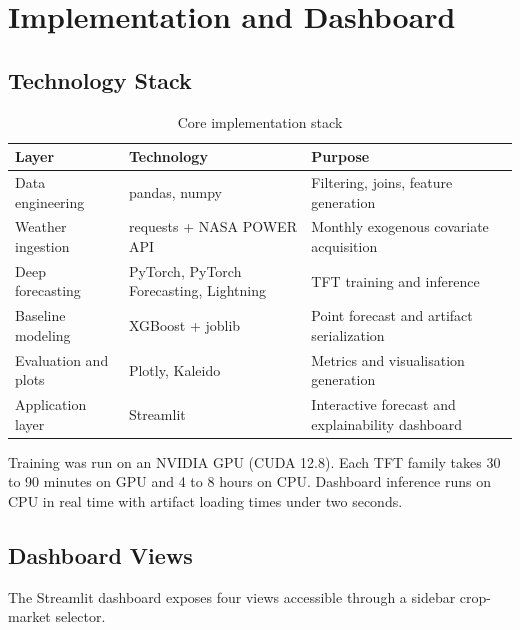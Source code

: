 \documentclass[12pt,a4paper]{report}
\begin{document}
\chapter{Implementation and Dashboard}

\section{Technology Stack}

\begin{table}[H]
\centering
\caption{Core implementation stack}
\label{tab:ch7_stack}
\small
\begin{tabularx}{\textwidth}{L{0.28\textwidth}L{0.28\textwidth}X}
\toprule
\textbf{Layer} & \textbf{Technology} & \textbf{Purpose} \\
\midrule
Data engineering     & pandas, numpy              & Filtering, joins, feature generation \\
Weather ingestion    & requests + NASA POWER API  & Monthly exogenous covariate acquisition \\
Deep forecasting     & PyTorch, PyTorch Forecasting, Lightning & TFT training and inference \\
Baseline modeling    & XGBoost + joblib           & Point forecast and artifact serialization \\
Evaluation and plots & Plotly, Kaleido            & Metrics and visualisation generation \\
Application layer    & Streamlit                  & Interactive forecast and explainability dashboard \\
\bottomrule
\end{tabularx}
\end{table}

Training was run on an NVIDIA GPU (CUDA 12.8). Each TFT family takes 30 to 90 minutes on
GPU and 4 to 8 hours on CPU. Dashboard inference runs on CPU in real time with artifact
loading times under two seconds.

\section{Dashboard Views}

The Streamlit dashboard exposes four views accessible through a sidebar crop-market selector.
\end{document}
